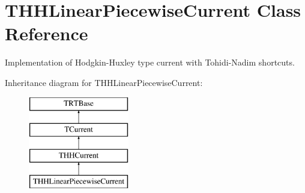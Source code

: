 \hypertarget{class_t_h_h_linear_piecewise_current}{\section{T\+H\+H\+Linear\+Piecewise\+Current Class Reference}
\label{class_t_h_h_linear_piecewise_current}
}


Implementation of Hodgkin-\/\+Huxley type current with Tohidi-\/\+Nadim shortcuts.  


Inheritance diagram for T\+H\+H\+Linear\+Piecewise\+Current\+:\begin{figure}[H]
\begin{center}
\leavevmode
\includegraphics[height=4.000000cm]{class_t_h_h_linear_piecewise_current}
\end{center}
\end{figure}

